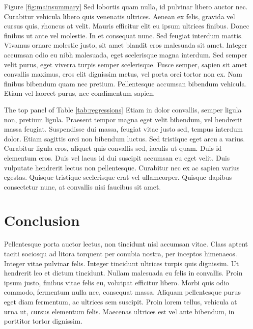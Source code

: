 \documentclass[12pt]{article}
\begin{document}


Figure \ref{fig:mainsummary} Sed lobortis quam nulla, id pulvinar libero auctor nec. Curabitur vehicula libero quis venenatis ultrices. Aenean ex felis, gravida vel cursus quis, rhoncus at velit. Mauris efficitur elit eu ipsum ultrices finibus. Donec finibus ut ante vel molestie. In et consequat nunc. Sed feugiat interdum mattis. Vivamus ornare molestie justo, sit amet blandit eros malesuada sit amet. Integer accumsan odio eu nibh malesuada, eget scelerisque magna interdum. Sed semper velit purus, eget viverra turpis semper scelerisque. Fusce semper, sapien sit amet convallis maximus, eros elit dignissim metus, vel porta orci tortor non ex. Nam finibus bibendum quam nec pretium. Pellentesque accumsan bibendum vehicula. Etiam vel laoreet purus, nec condimentum sapien.



The top panel of Table \ref{tab:regressions} Etiam in dolor convallis, semper ligula non, pretium ligula. Praesent tempor magna eget velit bibendum, vel hendrerit massa feugiat. Suspendisse dui massa, feugiat vitae justo sed, tempus interdum dolor. Etiam sagittis orci non bibendum luctus. Sed tristique eget arcu a varius. Curabitur ligula eros, aliquet quis convallis sed, iaculis ut quam. Duis id elementum eros. Duis vel lacus id dui suscipit accumsan eu eget velit. Duis vulputate hendrerit lectus non pellentesque. Curabitur nec ex ac sapien varius egestas. Quisque tristique scelerisque erat vel ullamcorper. Quisque dapibus consectetur nunc, at convallis nisi faucibus sit amet.


\section{Conclusion\label{sec:conclusion}}

Pellentesque porta auctor lectus, non tincidunt nisl accumsan vitae. Class aptent taciti sociosqu ad litora torquent per conubia nostra, per inceptos himenaeos. Integer vitae pulvinar felis. Integer tincidunt ultrices turpis quis dignissim. Ut hendrerit leo et dictum tincidunt. Nullam malesuada eu felis in convallis. Proin ipsum justo, finibus vitae felis eu, volutpat efficitur libero. Morbi quis odio commodo, fermentum nulla nec, consequat massa. Aliquam pellentesque purus eget diam fermentum, ac ultrices sem suscipit. Proin lorem tellus, vehicula at urna ut, cursus elementum felis. Maecenas ultrices est vel ante bibendum, in porttitor tortor dignissim.
\end{document}
